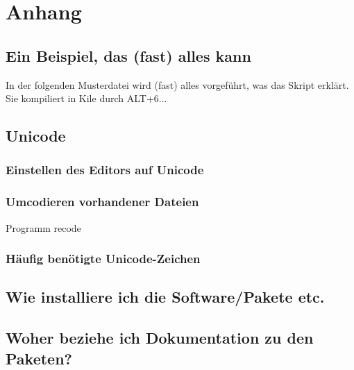 \chapter{Anhang}

\section{Ein Beispiel, das (fast) alles kann}

In der folgenden Musterdatei wird (fast) alles vorgeführt, was das Skript erklärt.
Sie kompiliert in Kile durch ALT+6...

%


\section{Unicode}
\label{unicode} 

\subsection{Einstellen des Editors auf Unicode}

\subsection{Umcodieren vorhandener Dateien}

Programm recode


\subsection{Häufig benötigte Unicode-Zeichen}

\label{utf8codes}

\section{Wie installiere ich die Software/Pakete etc.}







\section{Woher beziehe ich Dokumentation zu den Paketen?}
\label{paketdoku}

